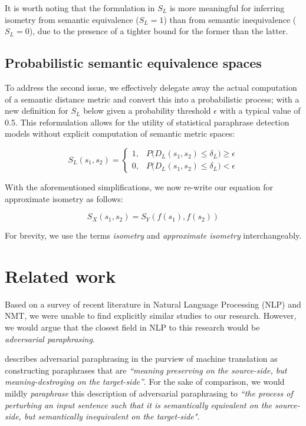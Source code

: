 \documentclass[11pt,a4paper]{article}
\begin{document}
It is worth noting that the formulation in $S_L$ is more meaningful for inferring isometry from semantic equivalence ($S_L=1$) than from semantic inequivalence ($S_L=0$), due to the presence of a tighter bound for the former than the latter.

\subsection{Probabilistic semantic equivalence spaces}

To address the second issue, we effectively delegate away the actual computation of a semantic distance metric and convert this into a probabilistic process; with a new definition for $S_L$ below given a probability threshold $\epsilon$ with a typical value of 0.5. This reformulation allows for the utility of statistical paraphrase detection models without explicit computation of semantic metric spaces:

\begin{equation}
  \label{bounded_isometry_probability_eqn}
  S_L(s_1,s_2) =
  \begin{cases}
    1, &P\big(D_L(s_1,s_2) \leq \delta_L\big) \geq \epsilon \\
    0, &P\big(D_L(s_1,s_2) \leq \delta_L\big) < \epsilon
  \end{cases}
\end{equation}

With the aforementioned simplifications, we now re-write our equation for approximate isometry as follows:

\begin{equation}  
  \label{exact_approx_isometry_eqn}
  S_X(s_1,s_2) = S_Y(f(s_1),f(s_2))
\end{equation}

For brevity, we use the terms \textit{isometry} and \textit{approximate isometry} interchangeably.

\section{Related work}

Based on a survey of recent literature in Natural Language Processing (NLP) and NMT, we were unable to find explicitly similar studies to our research. However, we would argue that the closest field in NLP to this research would be \textit{adversarial paraphrasing}.

\citet{michel2019evaluation} describes adversarial paraphrasing in the purview of machine translation as constructing paraphrases that are \textit{``meaning preserving on the source-side, but meaning-destroying on the target-side''}. For the sake of comparison, we would mildly \textit{paraphrase} this description of adversarial paraphrasing to \textit{``the process of perturbing an input sentence such that it is semantically equivalent on the source-side, but semantically inequivalent on the target-side"}.
\end{document}
